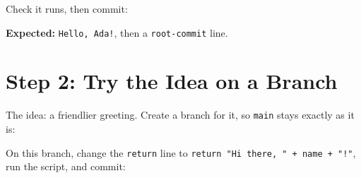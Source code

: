 
Check it runs, then commit:

\begin{codeblock}

\begin{Shaded}
\begin{Highlighting}[]
 
\end{Highlighting}
\end{Shaded}

\end{codeblock}

\textbf{Expected:} \texttt{Hello,\ Ada!}, then a \texttt{root-commit} line.


\section{Step 2: Try the Idea on a Branch}\label{10-lab-try-an-idea-without-breaking-anything:step-2-try-the-idea-on-a-branch}

The idea: a friendlier greeting. Create a branch for it, so \texttt{main} stays exactly as it is:

\begin{codeblock}

\begin{Shaded}
\begin{Highlighting}[]
\end{Highlighting}
\end{Shaded}

\end{codeblock}


On this branch, change the \texttt{return} line to \texttt{return\ "Hi\ there,}\allowbreak{}\texttt{\ "\ +\ name\ +\ "!"}, run the script, and commit:

\begin{codeblock}

\begin{Shaded}
\begin{Highlighting}[]
 
\end{Highlighting}
\end{Shaded}

\end{codeblock}

